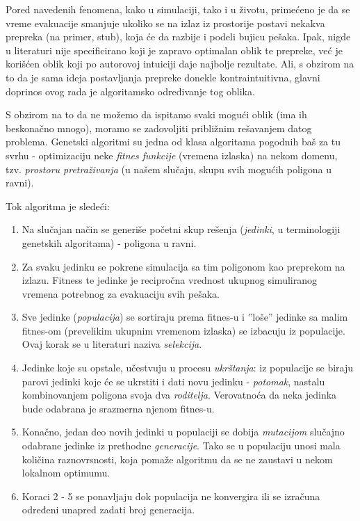 \documentclass[12pt]{article}
\begin{document}
Pored navedenih fenomena, kako u simulaciji, tako i u životu, primećeno je da se vreme evakuacije smanjuje ukoliko se na izlaz iz prostorije postavi nekakva prepreka (na primer, stub), koja će da razbije i podeli bujicu pešaka. Ipak, nigde u literaturi nije specificirano koji je zapravo optimalan oblik te prepreke, već je korišćen oblik koji po autorovoj intuiciji daje najbolje rezultate. Ali, s obzirom na to da je sama ideja postavljanja prepreke donekle kontraintuitivna, glavni doprinos ovog rada je algoritamsko određivanje tog oblika.

S obzirom na to da ne možemo da ispitamo svaki mogući oblik (ima ih beskonačno mnogo), moramo se zadovoljiti približnim rešavanjem datog problema. Genetski algoritmi su jedna od klasa algoritama pogodnih baš za tu svrhu - optimizaciju neke \emph{fitnes funkcije} (vremena izlaska) na nekom domenu, tzv. \emph{prostoru pretraživanja} (u našem slučaju, skupu svih mogućih poligona u ravni).

Tok algoritma je sledeći:
\begin{enumerate}
\item Na slučajan način se generiše početni skup rešenja (\emph{jedinki}, u terminologiji genetskih algoritama) - poligona u ravni.
\item Za svaku jedinku se pokrene simulacija sa tim poligonom kao preprekom na izlazu. Fitness te jedinke je recipročna vrednost ukupnog simuliranog vremena potrebnog za evakuaciju svih pešaka.
\item Sve jedinke (\emph{populacija}) se sortiraju prema fitnes-u i ''loše'' jedinke sa malim fitnes-om (prevelikim ukupnim vremenom izlaska) se izbacuju iz populacije. Ovaj korak se u literaturi naziva \emph{selekcija}.
\item Jedinke koje su opstale, učestvuju u procesu \emph{ukrštanja}: iz populacije se biraju parovi jedinki koje će se ukrstiti i dati novu jedinku - \emph{potomak}, nastalu kombinovanjem poligona svoja dva \emph{roditelja}. Verovatnoća da neka jedinka bude odabrana je srazmerna njenom fitnes-u.
\item Konačno, jedan deo novih jedinki u populaciji se dobija \emph{mutacijom} slučajno odabrane jedinke iz prethodne \emph{generacije}. Tako se u populaciju unosi mala količina raznovrsnosti, koja pomaže algoritmu da se ne zaustavi u nekom lokalnom optimumu.
\item Koraci 2 - 5 se ponavljaju dok populacija ne konvergira ili se izračuna određeni unapred zadati broj generacija.
\end{enumerate}
\end{document}
